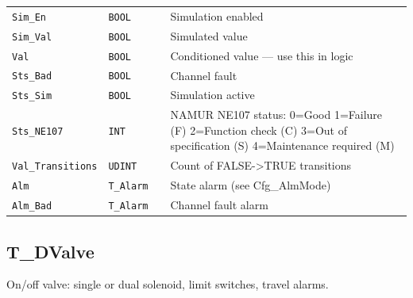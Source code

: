\begin{small}
\begin{longtable}{@{}P{3.70cm}P{2.20cm}P{1.70cm}P{8.91cm}@{}}
\texttt{Sim\_En} & \texttt{BOOL} &  & Simulation enabled \\
\texttt{Sim\_Val} & \texttt{BOOL} &  & Simulated value \\
\texttt{Val} & \texttt{BOOL} &  & Conditioned value --- use this in logic \\
\texttt{Sts\_Bad} & \texttt{BOOL} &  & Channel fault \\
\texttt{Sts\_Sim} & \texttt{BOOL} &  & Simulation active \\
\texttt{Sts\_NE107} & \texttt{INT} &  & NAMUR NE107 status: 0=Good 1=Failure (F) 2=Function check (C) 3=Out of specification (S) 4=Maintenance required (M) \\
\texttt{Val\_Transitions} & \texttt{UDINT} &  & Count of FALSE-\textgreater{}TRUE transitions \\
\texttt{Alm} & \texttt{T\_Alarm} &  & State alarm (see Cfg\_AlmMode) \\
\texttt{Alm\_Bad} & \texttt{T\_Alarm} &  & Channel fault alarm \\
\bottomrule
\end{longtable}
\end{small}

\subsection{T\_DValve}\label{sec:pclib-t-dvalve}

On/\allowbreak{}off valve: single or dual solenoid, limit switches, travel alarms.

\par{}\par

